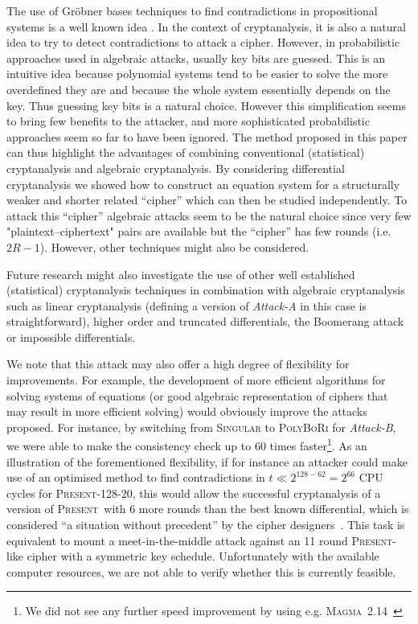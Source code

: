 \documentclass{llncs}
\newcommand{\PRESENT}{\textsc{Present}\xspace}
\begin{document}
The use of Gr\"obner bases techniques to find contradictions in propositional
systems is a well known idea \cite{Clegg1996}.
In the context of cryptanalysis, it is also a natural idea to try to detect
contradictions to attack a cipher. However, in probabilistic approaches used in
algebraic attacks, usually key bits are guessed. This is an intuitive idea
because polynomial systems tend to be easier to solve the more overdefined they
are and because the whole system essentially depends on the key. Thus guessing
key bits is a natural choice. However this simplification seems to bring few
benefits to the attacker, and more sophisticated probabilistic approaches
seem so far to have been ignored. The method
proposed in this
paper can thus highlight the advantages of combining conventional (statistical)
cryptanalysis and algebraic cryptanalysis. By considering differential
cryptanalysis we showed how to construct an equation system for a structurally
weaker and shorter related ``cipher'' which can then be studied independently.
To
attack this ``cipher'' algebraic attacks seem to be the natural choice since
very
few "plaintext--ciphertext" pairs are available but the ``cipher'' has few
rounds
(i.e. $2R-1$). However, other techniques might also be considered.

Future research might also investigate the use of other well established
(statistical) cryptanalysis techniques in combination with algebraic cryptanalysis
such as linear cryptanalysis (defining a version of \emph{Attack-A} in this case
is straightforward), higher order and truncated differentials, the Boomerang
attack or impossible differentials.

We note that this attack may also offer a high degree of flexibility for
improvements. For example, the development of more efficient algorithms for
solving systems of equations (or good algebraic representation of ciphers that
may result in more efficient solving) would obviously improve the attacks
proposed. For instance, by switching from \textsc{Singular} to
\textsc{PolyBoRi} for \emph{Attack-B}, we
were able to make the consistency check up to $60$ times faster\footnote{We did not see any further speed improvement by
using
e.g. \textsc{Magma}~2.14~\cite{magma}}. As an illustration of the
forementioned flexibility, if for instance an attacker could make use of an
optimised method to find contradictions in $t \ll 2^{128-62} = 2^{66}$ CPU
cycles for
\PRESENT-128-20, this would allow the successful cryptanalysis of a version of
\PRESENT\ with 6 more rounds than the best known differential, which is
considered ``a situation without precedent'' by the cipher
designers~\cite{present}. This task is equivalent to mount a
meet-in-the-middle attack against an 11 round \PRESENT-like cipher with a
symmetric key schedule. Unfortunately with the available computer resources,
we are not able to verify whether this is currently feasible.
\end{document}
